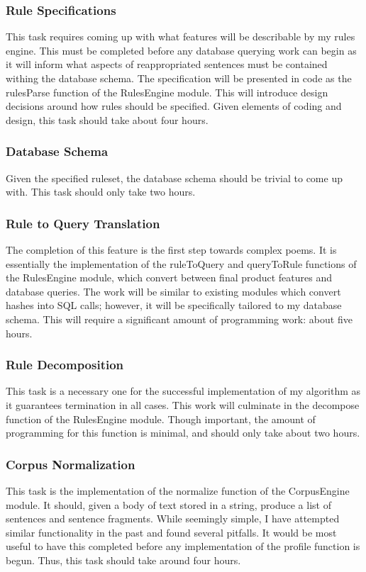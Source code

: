 \documentclass[10pt]{article}
\begin{document}
\subsubsection{Rule Specifications} 
This task requires coming up with what features will be describable by my rules
engine. This must be completed before any database querying work can begin
as it will inform what aspects of reappropriated sentences must be contained
withing the database schema. The specification will be presented in code as the
rulesParse function of the RulesEngine module. This will introduce design
decisions around how rules should be specified. Given elements of coding and
design, this task should take about four hours.

\subsubsection{Database Schema}
Given the specified ruleset, the database schema should be trivial to come up
with. This task should only take two hours.
 
\subsubsection{Rule to Query Translation}
The completion of this feature is the first step towards complex poems. It is
essentially the implementation of the ruleToQuery and queryToRule functions of
the RulesEngine module, which convert between final product features and
database queries. The work will be similar to existing modules which convert
hashes into SQL calls; however, it will be specifically tailored to my database
schema. This will require a significant amount of programming work: about five
hours.

\subsubsection{Rule Decomposition}
This task is a necessary one for the successful implementation of my algorithm
as it guarantees termination in all cases. This work will culminate in the
decompose function of the RulesEngine module. Though important, the amount of
programming for this function is minimal, and should only take about two hours.

\subsubsection{Corpus Normalization}
This task is the implementation of the normalize function of the CorpusEngine
module. It should, given a body of text stored in a string, produce a list of
sentences and sentence fragments. While seemingly simple, I have attempted
similar functionality in the past and found several pitfalls. It would be most
useful to have this completed before any implementation of the profile function
is begun. Thus, this task should take around four hours.
\end{document}

